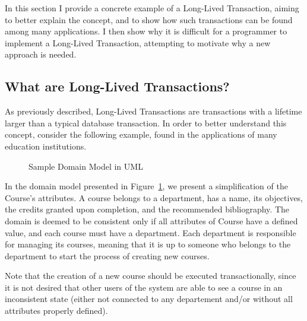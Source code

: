 \documentclass{llncs}
\begin{document}
In this section I provide a concrete example of a Long-Lived Transaction,
aiming to better explain the concept, and to show how such
transactions can be found among many applications. I then show why it
is difficult for a programmer to implement a Long-Lived Transaction,
attempting to motivate why a new approach is needed.

\subsection{What are Long-Lived Transactions?}
\label{sec:what}

As previously described, Long-Lived Transactions are transactions with
a lifetime larger than a typical database transaction. In order to
better understand this concept, consider the following example, found
in the applications of many education institutions.

\begin{figure}
\centering
{}

\caption{Sample Domain Model in UML} 
\label{fig:courseDomain}

\end{figure}

In the domain model presented in Figure~\ref{fig:courseDomain}, we
present a simplification of the Course's attributes. A course belongs
to a department, has a name, its objectives, the credits granted upon
completion, and the recommended bibliography. The domain is deemed to
be consistent only if all attributes of Course have a defined value,
and each course must have a department. Each department is responsible
for managing its courses, meaning that it is up to someone who belongs
to the department to start the process of creating new courses.

Note that the creation of a new course should be executed
transactionally, since it is not desired that other users of the
system are able to see a course in an inconsistent state (either not
connected to any departement and/or without all attributes properly defined).
\end{document}
